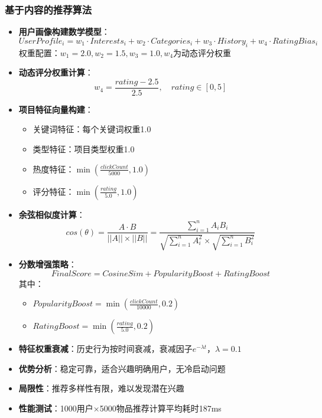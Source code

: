 \documentclass[12pt,a4paper]{article}
\begin{document}
\subsubsection{基于内容的推荐算法}
\begin{itemize}
    \item \textbf{用户画像构建数学模型}：
    \[UserProfile_i = w_1 \cdot Interests_i + w_2 \cdot Categories_i + w_3 \cdot History_i + w_4 \cdot RatingBias_i\]
    权重配置：\(w_1=2.0, w_2=1.5, w_3=1.0, w_4\)为动态评分权重
    \item \textbf{动态评分权重计算}：
    \[w_4 = \frac{rating - 2.5}{2.5}, \quad rating \in [0,5]\]
    \item \textbf{项目特征向量构建}：
    \begin{itemize}
        \item 关键词特征：每个关键词权重1.0
        \item 类型特征：项目类型权重1.0
        \item 热度特征：\(\min(\frac{clickCount}{5000}, 1.0)\)
        \item 评分特征：\(\min(\frac{rating}{5.0}, 1.0)\)
    \end{itemize}
    \item \textbf{余弦相似度计算}：
    \[cos(\theta) = \frac{A \cdot B}{||A|| \times ||B||} = \frac{\sum_{i=1}^{n} A_i B_i}{\sqrt{\sum_{i=1}^{n} A_i^2} \times \sqrt{\sum_{i=1}^{n} B_i^2}}\]
    \item \textbf{分数增强策略}：
    \[FinalScore = CosineSim + PopularityBoost + RatingBoost\]
    其中：
    \begin{itemize}
        \item \(PopularityBoost = \min(\frac{clickCount}{10000}, 0.2)\)
        \item \(RatingBoost = \min(\frac{rating}{5.0}, 0.2)\)
    \end{itemize}
    \item \textbf{特征权重衰减}：历史行为按时间衰减，衰减因子\(e^{-\lambda t}\)，\(\lambda=0.1\)
    \item \textbf{优势分析}：稳定可靠，适合兴趣明确用户，无冷启动问题
    \item \textbf{局限性}：推荐多样性有限，难以发现潜在兴趣
    \item \textbf{性能测试}：1000用户×5000物品推荐计算平均耗时187ms
\end{itemize}
\end{document}
